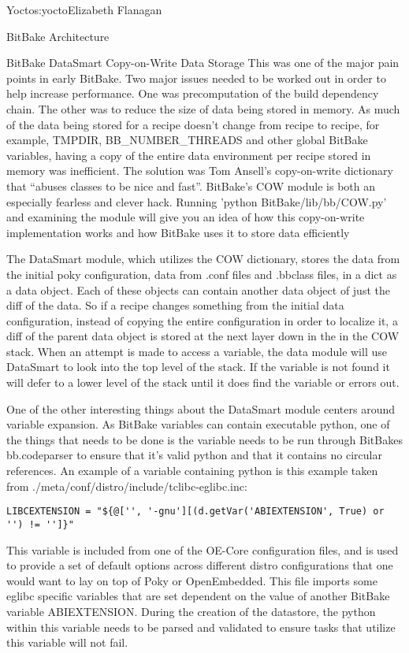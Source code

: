 \begin{aosachapter}{Yocto}{s:yocto}{Elizabeth Flanagan}
\begin{aosasect1}{BitBake Architecture}
\begin{aosasect2}{BitBake DataSmart Copy-on-Write Data Storage}
This was one of the major pain points in early BitBake. Two major
issues needed to be worked out in order to help increase performance.
One was precomputation of the build dependency chain. The other was to
reduce the size of data being stored in memory. As much of the data
being stored for a recipe doesn't change from recipe to recipe, for
example, TMPDIR, BB\_NUMBER\_THREADS and other global BitBake
variables, having a copy of the entire data environment per recipe
stored in memory was inefficient. The solution was Tom Ansell's
copy-on-write dictionary that ``abuses classes to be nice and fast''.
BitBake's COW module is both an especially fearless and clever hack.
Running 'python BitBake/lib/bb/COW.py' and examining the module will
give you an idea of how this copy-on-write implementation works and
how BitBake uses it to store data efficiently

The DataSmart module, which utilizes the COW dictionary, stores the
data from the initial poky configuration, data from .conf files and
.bbclass files, in a dict as a data object. Each of these objects can
contain another data object of just the diff of the data. So if a
recipe changes something from the initial data configuration, instead
of copying the entire configuration in order to localize it, a diff of
the parent data object is stored at the next layer down in the in the
COW stack. When an attempt is made to access a variable, the data
module will use DataSmart to look into the top level of the stack. If
the variable is not found it will defer to a lower level of the stack
until it does find the variable or errors out.

One of the other interesting things about the DataSmart module centers
around variable expansion. As BitBake variables can contain executable
python, one of the things that needs to be done is the variable needs
to be run through BitBakes bb.codeparser to ensure that it's valid
python and that it contains no circular references.  An example of a
variable containing python is this example taken from
./meta/conf/distro/include/tclibc-eglibc.inc:

\begin{verbatim}
LIBCEXTENSION = "${@['', '-gnu'][(d.getVar('ABIEXTENSION', True) or '') != '']}"
\end{verbatim}

This variable is included from one of the OE-Core configuration files,
 and is used to
provide a set of default options across different distro
configurations that one would want to lay on top of Poky or
OpenEmbedded. This file imports some eglibc specific variables that
are set dependent on the value of another BitBake variable
ABIEXTENSION. During the creation of the datastore, the python within
this variable needs to be parsed and validated to ensure tasks that
utilize this variable will not fail.


\end{aosasect2}
\end{aosasect1}
\end{aosachapter}

